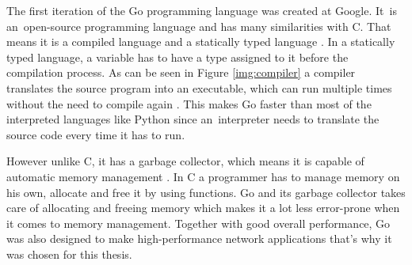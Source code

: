 The first iteration of the Go programming language was created at Google. It~is an~open-source programming language and has many similarities with C. That means it is a compiled language and a statically typed language \cite{Donovan2016}. In a statically typed language, a variable has to have a type assigned to it before the compilation process. As can be seen in Figure \ref{img:compiler} a compiler translates the source program into an executable, which can run multiple times without the need to compile again \cite{Aho2006}. This makes Go faster than most of the interpreted languages like Python since an~interpreter needs to translate the source code every time it has to run.


However unlike C, it has a garbage collector, which means it is capable of automatic memory management \cite{Donovan2016}. In C a programmer has to manage memory on his own, allocate and free it by using functions. Go and its garbage collector takes care of allocating and freeing memory which makes it a lot less error-prone when it comes to memory management. Together with good overall performance, Go was also designed to make high-performance network applications that's why it was chosen for this thesis.
